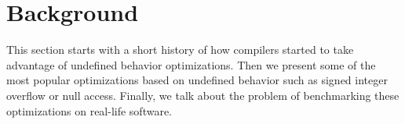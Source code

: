 \section{Background} \label{sec:bg}

This section starts with a short history of how compilers started to
take advantage of undefined behavior optimizations. Then we present some
of the most popular optimizations based on undefined behavior such as
signed integer overflow or null access. Finally, we talk about the
problem of benchmarking these optimizations on real-life software.
